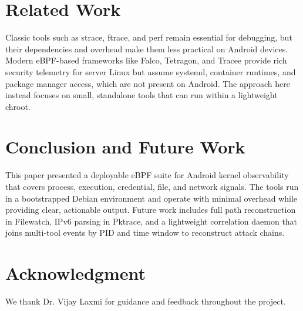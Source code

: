 \documentclass[conference]{IEEEtran}
\begin{document}
\section{Related Work}
Classic tools such as strace, ftrace, and perf remain essential for debugging, but their dependencies and overhead make them less practical on Android devices. Modern eBPF-based frameworks like Falco, Tetragon, and Tracee provide rich security telemetry for server Linux but assume systemd, container runtimes, and package manager access, which are not present on Android.\cite{falco_doc,tetragon_doc,tracee_doc} The approach here instead focuses on small, standalone tools that can run within a lightweight chroot.

\section{Conclusion and Future Work}
This paper presented a deployable eBPF suite for Android kernel observability that covers process, execution, credential, file, and network signals. The tools run in a bootstrapped Debian environment and operate with minimal overhead while providing clear, actionable output. Future work includes full path reconstruction in Filewatch, IPv6 parsing in Pktrace, and a lightweight correlation daemon that joins multi-tool events by PID and time window to reconstruct attack chains.

\section*{Acknowledgment}
We thank Dr. Vijay Laxmi for guidance and feedback throughout the project.



\end{document}
